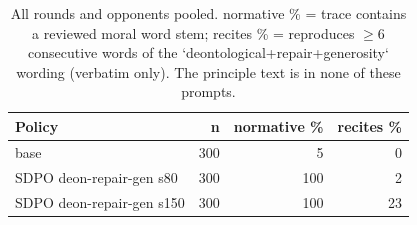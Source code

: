 \begin{table}[t]
\centering
\caption{All rounds and opponents pooled. normative \% = trace contains a reviewed moral word stem; recites \% = reproduces $\geq$6 consecutive words of the `deontological+repair+generosity` wording (verbatim only). The principle text is in none of these prompts.}
\label{tab:mr-traces}
\small
\setlength{\tabcolsep}{3.5pt}
\begin{tabular}{lrrr}
\toprule
Policy & n & normative \% & recites \% \\
\midrule
base & 300 & 5 & 0 \\
SDPO deon-repair-gen s80 & 300 & 100 & 2 \\
SDPO deon-repair-gen s150 & 300 & 100 & 23 \\
\bottomrule
\end{tabular}
\end{table}

